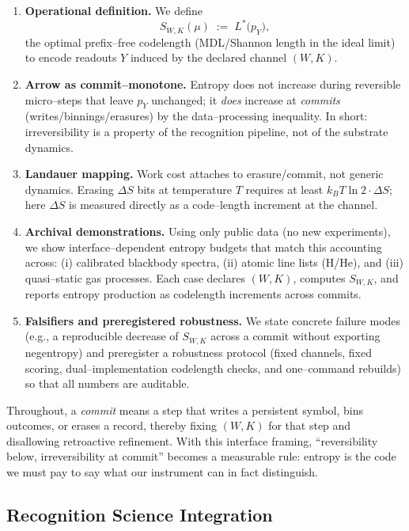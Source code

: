 \documentclass[11pt,letterpaper]{article}
\theoremstyle{definition}
\theoremstyle{remark}
\begin{document}
\begin{enumerate}[leftmargin=*]
  \item \textbf{Operational definition.} We define
  \[
  S_{W,K}(\mu)\;:=\;L^\ast\!\big(p_Y\big),
  \]
  the optimal prefix--free codelength (MDL/Shannon length in the ideal limit) to encode readouts \(Y\) induced by the declared channel \((W,K)\).
  
  \item \textbf{Arrow as commit--monotone.} Entropy does not increase during reversible micro--steps that leave \(p_Y\) unchanged; it \emph{does} increase at \emph{commits} (writes/binnings/erasures) by the data--processing inequality. In short: irreversibility is a property of the recognition pipeline, not of the substrate dynamics.
  
  \item \textbf{Landauer mapping.} Work cost attaches to erasure/commit, not generic dynamics. Erasing \(\Delta S\) bits at temperature \(T\) requires at least \(k_B T\ln 2 \cdot \Delta S\); here \(\Delta S\) is measured directly as a code--length increment at the channel.
  
  \item \textbf{Archival demonstrations.} Using only public data (no new experiments), we show interface--dependent entropy budgets that match this accounting across: (i) calibrated blackbody spectra, (ii) atomic line lists (H/He), and (iii) quasi--static gas processes. Each case declares \((W,K)\), computes \(S_{W,K}\), and reports entropy production as codelength increments across commits.
  
  \item \textbf{Falsifiers and preregistered robustness.} We state concrete failure modes (e.g., a reproducible decrease of \(S_{W,K}\) across a commit without exporting negentropy) and preregister a robustness protocol (fixed channels, fixed scoring, dual--implementation codelength checks, and one--command rebuilds) so that all numbers are auditable.
\end{enumerate}

\noindent Throughout, a \emph{commit} means a step that writes a persistent symbol, bins outcomes, or erases a record, thereby fixing \((W,K)\) for that step and disallowing retroactive refinement. With this interface framing, ``reversibility below, irreversibility at commit'' becomes a measurable rule: entropy is the code we must pay to say what our instrument can in fact distinguish.

\subsection{Recognition Science Integration}
\end{document}
